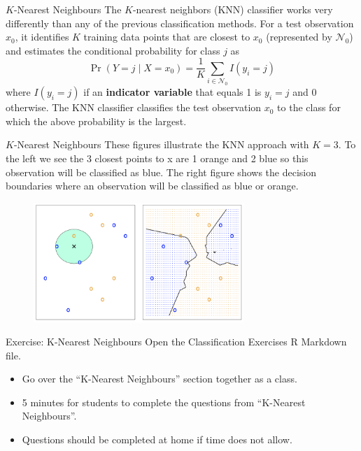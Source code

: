 \documentclass[
  ignorenonframetext,
  aspectratio=169,
]{beamer}
\begin{document}
\begin{frame}{\(K\)-Nearest Neighbours}
\protect\hypertarget{k-nearest-neighbours}{}
The \(K\)-nearest neighbors (KNN) classifier works very differently than
any of the previous classification methods. For a test observation
\(x_0\), it identifies \(K\) training data points that are closest to
\(x_0\) (represented by \(\mathcal{N}_0\)) and estimates the conditional
probability for class \(j\) as \[
\operatorname{Pr}\left(Y=j \mid X=x_{0}\right)=\frac{1}{K} \sum_{i \in \mathcal{N}_{0}} I\left(y_{i}=j\right)
\] where \(I(y_i = j)\) if an \textbf{indicator variable} that equals 1
is \(y_i = j\) and 0 otherwise. The KNN classifier classifies the test
observation \(x_0\) to the class for which the above probability is the
largest.
\end{frame}

\begin{frame}{\(K\)-Nearest Neighbours}
\protect\hypertarget{k-nearest-neighbours-1}{}
These figures illustrate the KNN approach with \(K=3\). To the left we
see the 3 closest points to x are 1 orange and 2 blue so this
observation will be classified as blue. The right figure shows the
decision boundaries where an observation will be classified as blue or
orange.

\begin{figure}

{\centering \includegraphics[width=3.125in,height=\textheight]{images/KNN1.png}

}

\end{figure}
\end{frame}

\begin{frame}{Exercise: K-Nearest Neighbours}
\protect\hypertarget{exercise-k-nearest-neighbours}{}
Open the Classification Exercises R Markdown file.

\begin{itemize}
\item
  Go over the ``K-Nearest Neighbours'' section together as a class.
\item
  5 minutes for students to complete the questions from ``K-Nearest
  Neighbours''.
\item
  Questions should be completed at home if time does not allow.
\end{itemize}
\end{frame}
\end{document}
